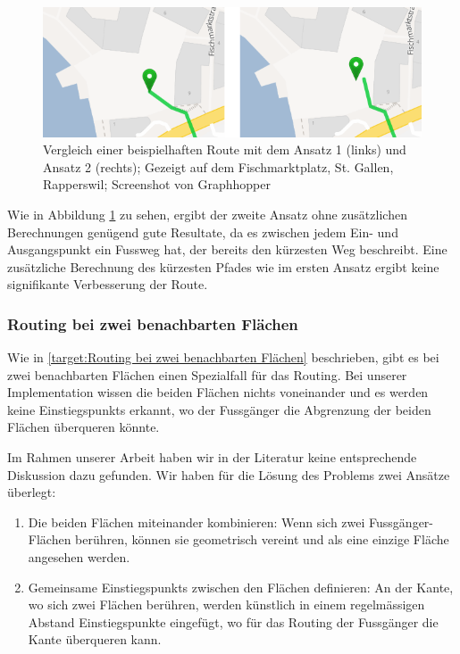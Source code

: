 \begin{figure}[ht]
    \centering
    \includegraphics[width=1\linewidth]{technicalreport/img/vergleich_start-punkt-auf-flaeche}
    \caption[Vergleich der Ansätze wenn Startpunkt auf Fläche]{Vergleich einer beispielhaften Route mit dem Ansatz 1 (links) und Ansatz 2 (rechts); Gezeigt auf dem Fischmarktplatz, St. Gallen, Rapperswil; Screenshot von Graphhopper \cite{graphhopper}}
    \label{fig:vergleich_start-punkt_auf_fläche}
\end{figure}


Wie in Abbildung \ref{fig:vergleich_start-punkt_auf_fläche} zu sehen, ergibt der zweite Ansatz ohne zusätzlichen Berechnungen genügend gute Resultate, da es zwischen jedem Ein- und Ausgangspunkt ein Fussweg hat, der bereits den kürzesten Weg beschreibt. Eine zusätzliche Berechnung des kürzesten Pfades wie im ersten Ansatz ergibt keine signifikante Verbesserung der Route.

\subsubsection{Routing bei zwei benachbarten Flächen}
\label{subsub:Routing bei zwei benachbarten Flächen}

Wie in \ref{target:Routing bei zwei benachbarten Flächen} beschrieben, gibt es bei zwei benachbarten Flächen einen Spezialfall für das Routing. Bei unserer Implementation wissen die beiden Flächen nichts voneinander und es werden keine \glspl{Einstiegspunkt} erkannt, wo der Fussgänger die Abgrenzung der beiden Flächen überqueren könnte.

Im Rahmen unserer Arbeit haben wir in der Literatur keine entsprechende Diskussion dazu gefunden. Wir haben für die Lösung des Problems zwei Ansätze überlegt:

\begin{enumerate}
    \item Die beiden Flächen miteinander kombinieren: Wenn sich zwei Fussgänger-Flächen berühren, können sie geometrisch vereint und als eine einzige Fläche angesehen werden.
    \item Gemeinsame \glspl{Einstiegspunkt} zwischen den Flächen definieren: An der Kante, wo sich zwei Flächen berühren, werden künstlich in einem regelmässigen Abstand Einstiegspunkte eingefügt, wo für das Routing der Fussgänger die Kante überqueren kann.
\end{enumerate}


